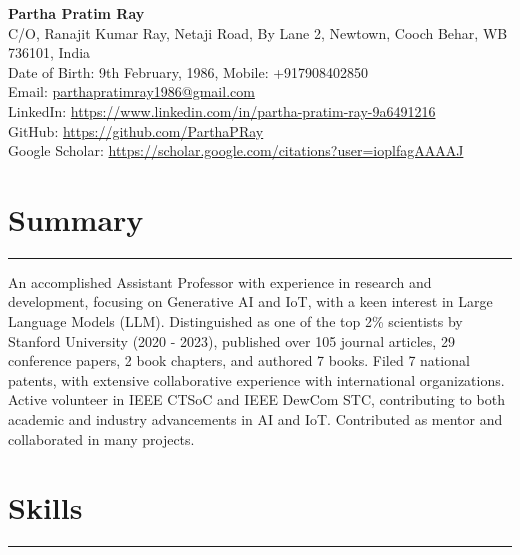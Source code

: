 \documentclass[10pt]{article}
\begin{document}
	
	\begin{center}
		\textbf{\Large Partha Pratim Ray}\\
		\vspace{2mm}
		C/O, Ranajit Kumar Ray, Netaji Road, By Lane 2, Newtown, Cooch Behar, WB 736101, India \\
     Date of Birth: 9th February, 1986, Mobile: +917908402850 \\
          Email: \href{mailto:parthapratimray1986@gmail.com}{parthapratimray1986@gmail.com}\\
		LinkedIn: \href{https://www.linkedin.com/in/partha-pratim-ray-9a6491216}{https://www.linkedin.com/in/partha-pratim-ray-9a6491216} \\
		GitHub: \href{https://github.com/ParthaPRay}{https://github.com/ParthaPRay} \\
		Google Scholar: \href{https://scholar.google.com/citations?user=ioplfagAAAAJ}{https://scholar.google.com/citations?user=ioplfagAAAAJ}\\
		\vspace{2mm}
	\end{center}
	
	\vspace*{-8mm}	
	
	\section*{Summary}
	\vspace*{-2.5mm}
	\hrule 
	\vspace*{2mm}
An accomplished Assistant Professor with experience in research and development, focusing on Generative AI and IoT, with a keen interest in Large Language Models (LLM). Distinguished as one of the top 2\% scientists by Stanford University (2020 - 2023), published over 105 journal articles, 29 conference papers, 2 book chapters, and authored 7 books. Filed 7 national patents, with extensive collaborative experience with international organizations. Active volunteer in IEEE CTSoC and IEEE DewCom STC, contributing to both academic and industry advancements in AI and IoT. Contributed as mentor and collaborated in many projects.

	
	\vspace*{-3mm}	
		
		
		\section*{Skills}
		\vspace*{-2.5mm}
		\hrule 
		\vspace*{2mm}
\end{document}
